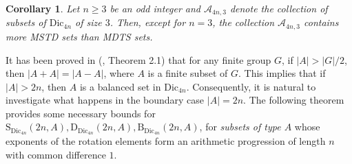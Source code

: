 \documentclass[11pt,reqno]{amsart}
\numberwithin{equation}{section}
\newtheorem{corollary}{Corollary}[section]
\begin{document}
\begin{corollary}\label{Corollary1.2}
Let $n\geq 3$ be an odd integer and $\mathcal{A}_{4n,3}$ denote the collection of subsets of $\mathrm{Dic}_{4n}$ of size $3$. Then, except for $n=3$, the collection $\mathcal{A}_{4n,3}$ contains more MSTD sets than MDTS sets.
\end{corollary}

It has been proved in (\cite{gr12}, Theorem 2.1) that  for any finite group $G$, if $|A|>|G|/2$, then $|A+A|=|A-A|$, where $A$ is a finite subset of  $G$. This implies that if $|A|>2n$, then $A$ is a balanced set in $\mathrm{Dic}_{4n}$. Consequently, it is natural to investigate what happens in the boundary case $|A|=2n$. The following theorem provides some necessary bounds for $ \mathrm{S}_{\mathrm{Dic}_{4n}}(2n,A), \mathrm{D}_{\mathrm{Dic}_{4n}}(2n,A), \mathrm{B}_{\mathrm{Dic}_{4n}}(2n,A)$, for \textit{subsets of type $A$} whose exponents of the rotation elements form an arithmetic progression of length $n$ with common difference $1$.
\end{document}
